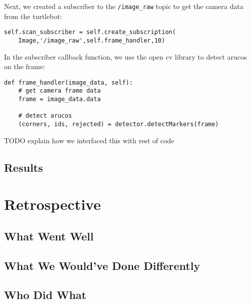 \documentclass{article}
\begin{document}
Next, we created a subscriber to the \verb|/image_raw| topic to get the camera data from the turtlebot:

\begin{lstlisting}
self.scan_subscriber = self.create_subscription(
    Image,'/image_raw',self.frame_handler,10)
\end{lstlisting}

In the subscriber callback function, we use the open cv library to detect arucos on the frame:

\begin{lstlisting}
def frame_handler(image_data, self):
    # get camera frame data
    frame = image_data.data

    # detect arucos
    (corners, ids, rejected) = detector.detectMarkers(frame)
\end{lstlisting}

TODO explain how we interfaced this with rest of code

\subsection{Results}

\section{Retrospective}

\subsection{What Went Well}

\subsection{What We Would've Done Differently}

\subsection{Who Did What}
\end{document}

